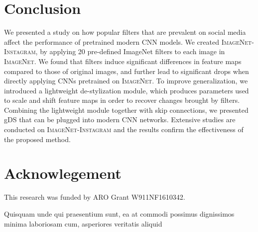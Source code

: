 \documentclass[letterpaper]{article} %
\newcommand{\instagram}{{\scshape ImageNet-Instagram}\xspace}
\newcommand{\imagenet}{{\scshape ImageNet}\xspace}
\newcommand{\gsystem}{gDS\xspace}
\begin{document}
\section{Conclusion}
We presented a study on how popular filters that are prevalent on social media affect the performance of pretrained modern CNN models. We created \instagram, by applying 20 pre-defined ImageNet filters to each image in \imagenet. We found that filters induce significant differences in feature maps compared to those of original images, and further lead to significant drops when directly applying CNNs pretrained on \imagenet. To improve generalization, we introduced a lightweight de-stylization module, which produces parameters used to scale and shift feature maps in order to recover changes brought by filters. Combining the lightweight module together with skip connections, we presented \gsystem that can be plugged into modern CNN networks. Extensive studies are conducted on \instagram and the results confirm the effectiveness of the proposed method.

\section{Acknowlegement}
This research was funded by ARO Grant W911NF1610342.


Quisquam unde qui praesentium sunt, ea at commodi possimus dignissimos minima laboriosam cum, asperiores veritatis aliquid

\end{document}
